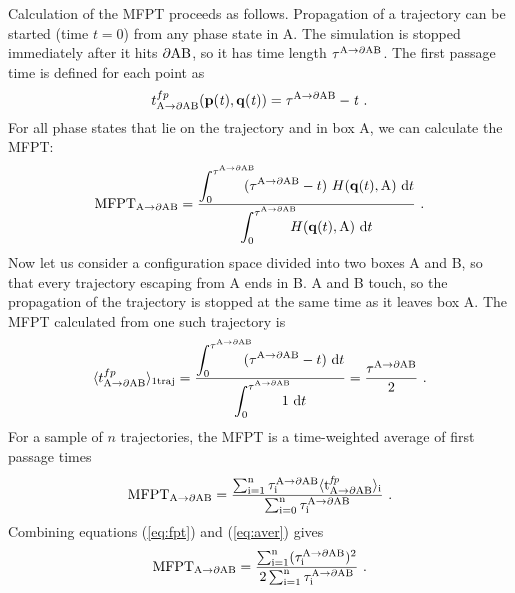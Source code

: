 Calculation of the MFPT proceeds as follows.
Propagation of a trajectory can be started (time $t=0$) from any phase state in A.
The simulation is stopped immediately after it hits $\partial \rm AB$, so it has time length $\tau^{\rm A\rightarrow \partial AB}$.
The first passage time is defined for each point as
\begin{equation}
t^{fp}_{\rm A \rightarrow \partial AB}(\bf p\it (t), \bf q\it (t)) = \tau^{\rm A \rightarrow \partial  AB} - t ~.
\end{equation}
For all phase states that lie on the trajectory and in box A, we can calculate the MFPT:
\begin{equation}
{\rm MFPT}_{\rm A \rightarrow \partial AB} = \frac{\displaystyle{\int_0^{\tau^{\rm A \rightarrow \partial AB}} \!\!\!\!\! (\tau^{\rm A \rightarrow \partial AB} - t) ~ H ({\bf q}(t), {\rm A}) ~ {\rm d} t}}
{\displaystyle{\int_0^{\tau^{\rm A \rightarrow \partial AB}} \!\!\!\! H ({\bf q}(t), {\rm A}) ~ {\rm d} t}} ~.
\end{equation}
Now let us consider a configuration space divided into two boxes A and B, so that every trajectory escaping from A ends in B.
A and B touch, so the propagation of the trajectory is stopped at the same time as it leaves box A.
The MFPT calculated from one such trajectory is
\begin{equation}
\label{eq:fpt}
\langle t^{fp}_{\rm A \rightarrow \partial AB} \rangle_{\rm 1traj} = \frac{\displaystyle \int_0^{\tau^{\rm A \rightarrow \partial AB}} \!\!\!\! (\tau^{\rm A \rightarrow \partial AB} - t) ~ {\rm d} t}
{\displaystyle \int_0^{\tau^{\rm A \rightarrow \partial AB}} \!\!\!\!\! 1 ~ {\rm d} t}
= \frac{\tau^{\rm A \rightarrow \partial AB}}{2} ~.
\end{equation}
For a sample of $n$ trajectories, the MFPT is a time-weighted average of first passage times
\begin{equation}
\label{eq:aver}
\rm MFPT_{\rm A \rightarrow \partial AB} 
= \frac{\sum_{i=1}^n \tau^{\rm A \rightarrow \partial AB}_i \langle t^{\it fp}_{\rm A \rightarrow \partial AB \it} \rangle_{i}}{\sum_{i=0}^n \tau^{\rm A \rightarrow \partial AB}_i} ~.
\end{equation}
Combining equations (\ref{eq:fpt}) and (\ref{eq:aver}) gives
\begin{equation}
\label{eq:mfptk}
\rm MFPT_{\rm A \rightarrow \partial AB} 
= \frac{\sum_{i=1}^n (\tau^{\rm A \rightarrow \partial AB}_i)^2}{2 \sum_{i=1}^n \tau^{\rm A \rightarrow \partial AB}_i} ~.
\end{equation}

